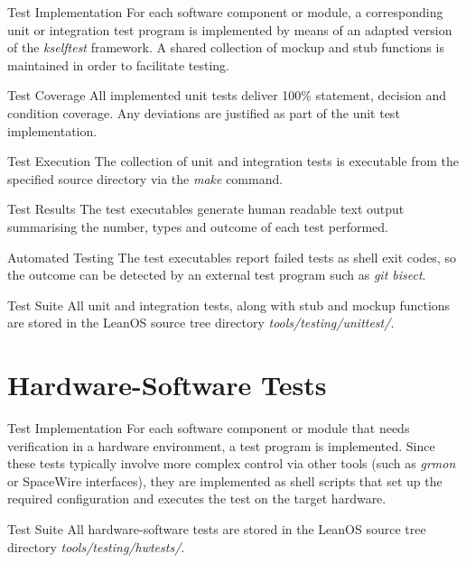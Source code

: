 {Test Implementation}{%
For each software component or module, a corresponding unit or integration test
program is implemented by means of an adapted version of the \emph{kselftest}
framework. A shared collection of mockup and stub functions is maintained in
order to facilitate testing.
}%
{}{}

{Test Coverage}{%
All implemented unit tests deliver 100\% statement, decision and condition
coverage. Any deviations are justified as part of the unit test implementation.
}%
{}{}

{Test Execution}{%
The collection of unit and integration tests is executable from the specified
source directory via the \emph{make} command.
}%
{}{}


{Test Results}{%
The test executables generate human readable text output summarising the number,
types and outcome of each test performed.
}%
{}{}


{\hspace{0pt} Automated  Testing}{%
The test executables report failed tests as shell exit codes, so the outcome
can be detected by an external test program such as \emph{git bisect}.
}%
{}{}

{Test Suite}{%
All unit and integration tests, along with stub and mockup functions are stored
in the LeanOS source tree directory \mbox{\emph{tools/testing/unittest/}}.
}%
{}{}



\section{Hardware-Software Tests}

{Test Implementation}{%
For each software component or module that needs verification in a hardware
environment, a test program is implemented.
}%
{}{Since these tests typically involve more complex control %
via other tools (such as \emph{grmon} or \gls{SpaceWire} interfaces), they are %
implemented as shell scripts that set up the required configuration and %
executes the test on the target hardware. %
}


{Test Suite}{%
All hardware-software tests are stored in the LeanOS source
tree directory \mbox{\emph{tools/testing/hwtests/}}.%
}%
{}{}


